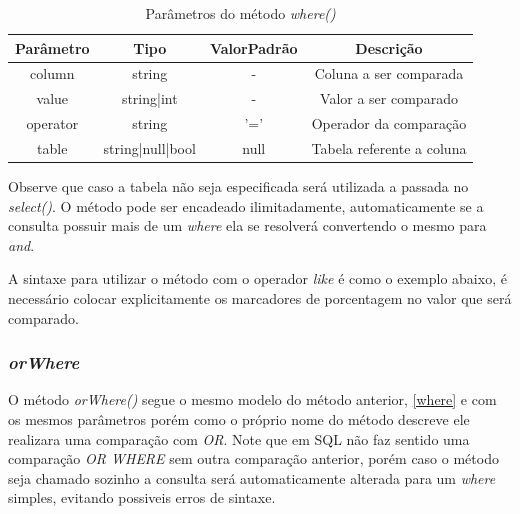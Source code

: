 \begin{table}[ht]
\centering
\vspace{0.5cm}
\begin{tabular}{|c|c|c|c|}
\hline  
Parâmetro & Tipo & ValorPadrão & Descrição \\
\hline 
column   & string     & -    & Coluna a ser comparada    \\
value    & string|int & -    & Valor a ser comparado     \\
operator & string     & '='  & Operador da comparação    \\
table & string|null|bool   & null & Tabela referente a coluna \\
\hline
\end{tabular}
\caption{Parâmetros do método \textit{where()}}
\end{table}

Observe que caso a tabela não seja especificada será utilizada a passada no \textit{select()}. O método pode ser encadeado ilimitadamente, automaticamente se a consulta possuir mais de um \textit{where} ela se resolverá convertendo o mesmo para \textit{and}.

\spaceH{}

\label{scripts/query_multiple_conditions.php}

A sintaxe para utilizar o método com o operador \textit{like} é como o exemplo abaixo, é necessário colocar explicitamente os marcadores de porcentagem no valor que será comparado.

\spaceH{}

\label{scripts/query_with_like_condition.php}

\subsubsection{\textit{orWhere}}

O método \textit{orWhere()} segue o mesmo modelo do método anterior, \ref{where} e com os mesmos parâmetros porém como o próprio nome do método descreve ele realizara uma comparação com \textit{OR}. Note que em SQL não faz sentido uma comparação \textit{OR WHERE} sem outra comparação anterior, porém caso o método seja chamado sozinho a consulta será automaticamente alterada para um \textit{where} simples, evitando possiveis erros de sintaxe.

